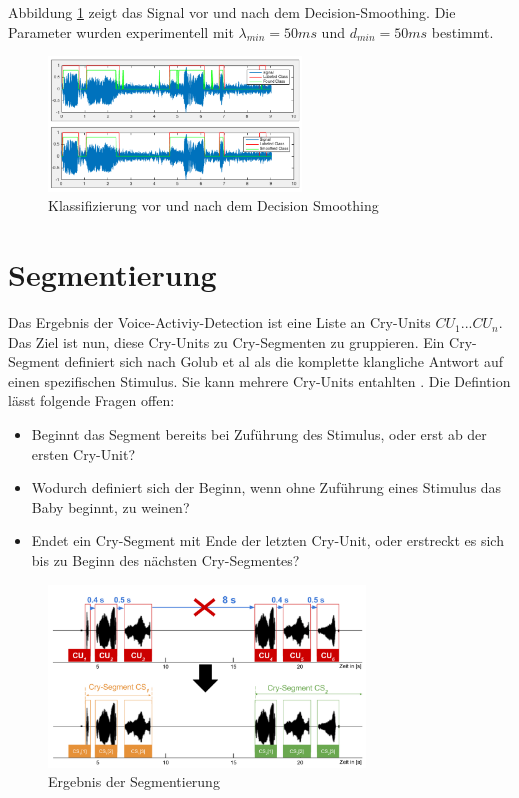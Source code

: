 Abbildung \ref{img:after-smoothing} zeigt das Signal vor und nach dem Decision-Smoothing. Die Parameter wurden experimentell mit $\lambda_{min} = 50 ms$ und $d_{min} = 50 ms$ bestimmt.

\begin{figure}[h]
	\centering
	\includegraphics[width=0.6\textwidth]{bilder/smoothing04.png}
	\caption{Klassifizierung vor und nach dem Decision Smoothing}
	\label{img:after-smoothing}
\end{figure}

\section{Segmentierung}

Das Ergebnis der Voice-Activiy-Detection ist eine Liste an Cry-Units  $CU_1 ... CU_n$. Das Ziel ist nun, diese Cry-Units zu Cry-Segmenten zu gruppieren. Ein Cry-Segment definiert sich nach Golub et al \cite{cryModel} als \glqq die komplette klangliche Antwort auf einen spezifischen Stimulus. Sie kann mehrere Cry-Units entahlten \grqq . Die Defintion lässt folgende Fragen offen:

\begin{itemize}[leftmargin=*]
	\item Beginnt das Segment bereits bei Zuführung des Stimulus, oder erst ab der ersten Cry-Unit? 
	\item Wodurch definiert sich der Beginn, wenn ohne Zuführung eines Stimulus das Baby beginnt, zu weinen?
	\item Endet ein Cry-Segment mit Ende der letzten \glqq Cry-Unit\grqq{}, oder erstreckt es sich bis zu Beginn des nächsten Cry-Segmentes?
\end{itemize}

\begin{figure}[h]
	\centering
	\includegraphics[width=0.75\textwidth]{bilder/segmentierung06.png}
	\caption{Ergebnis der Segmentierung}
	\label{img:segmenting03}
\end{figure}


